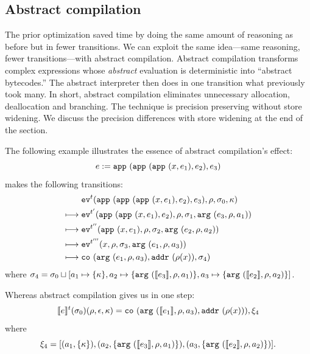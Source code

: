 \documentclass[9pt]{sigplanconf} %
\begin{document}

\subsection{Abstract compilation}

The prior optimization saved time by doing the same amount of
reasoning as before but in fewer transitions. We can exploit the same
idea---same reasoning, fewer transitions---with abstract
compilation. Abstract compilation transforms complex expressions whose
\emph{abstract} evaluation is deterministic into ``abstract
bytecodes.''  The abstract interpreter then does in one transition
what previously took many. In short, abstract compilation eliminates
unnecessary allocation, deallocation and branching. The technique is
precision preserving without store widening. We discuss the precision
differences with store widening at the end of the section.

The following example illustrates
the essence of abstract compilation's effect:
\[
\mexp := \sapp{\sapp{\sapp\mvar{\mexp_1}}{\mexp_2}}{\mexp_3}
\]
makes the following transitions:
\begin{align}
& \ev[^\mcntr]{\sapp{\sapp{\sapp\mvar{\mexp_1}}{\mexp_2}}{\mexp_3},\menv,\msto_0,\mkont}\\
\machstep\; &
\ev[^{\mcntr'}]{\sapp{\sapp\mvar{\mexp_1}}{\mexp_2},\menv,\msto_1,\kar{\mexp_3,\menv,\maddr_1}}
\\
\machstep\; &
\ev[^{\mcntr''}]{\sapp\mvar{\mexp_1},\menv,\msto_2,\kar{\mexp_2,\menv,\maddr_2}}
\\
\machstep\; &
\ev[^{\mcntr'''}]{\mvar, \menv,\msto_3,\kar{\mexp_1,\menv,\maddr_3}} %
\\
\machstep\; &
\spchoice
{\co{\kar{\mexp_1,\menv,\maddr_3},\saddr{\menv(\mvar)},\msto_4}}
{\co{\kar{\mexp_1,\menv,\maddr_{f3},\maddr_{a3},\maddr_3},\superposition{\msto_4(\menv(\mvar))},\msto_4}}
\end{align}
where \(
\msto_4 = \msto_0 \sqcup [\maddr_1 \mapsto \setof{\mkont},
\maddr_2 \mapsto \setof{\kar{\compile{\mexp_3},\menv,\maddr_1}},
\maddr_3 \mapsto \setof{\kar{\compile{\mexp_2},\menv,\maddr_2}}]\).

Whereas abstract compilation gives us in one step:
\begin{align*}
\compile{\mexp}^\mcntr(\msto_0)(\menv,\epsilon,\mkont) =
\spchoice
{\co{\kar{\compile{\mexp_1},\menv,\maddr_3},\saddr{\menv(\mvar)}},\msdiff_4}
{\co{\kar{\compile{\mexp_1},\menv,\maddr_{f3},\maddr_{a3},\maddr_3},\superposition{\msto'_4(\menv(\mvar))},\msto'_4}}
\end{align*}
where
\begin{equation*}
\msdiff_4 = [\ttuple{\maddr_1}{\setof{\mkont}},
             \ttuple{\maddr_2}{\setof{\kar{\compile{\mexp_3},\menv,\maddr_1}}},
             \ttuple{\maddr_3}{\setof{\kar{\compile{\mexp_2},\menv,\maddr_2}}}]\text.
\end{equation*}
\end{document}
